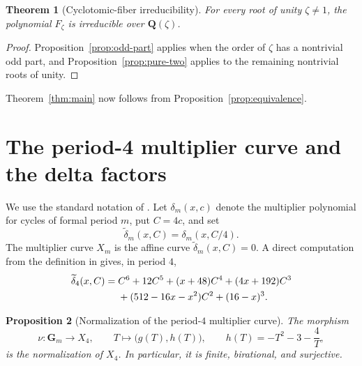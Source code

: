 \documentclass[11pt]{article}
\newtheorem{theorem}{Theorem}[section]
\newtheorem{proposition}[theorem]{Proposition}
\newcommand{\Q}{\mathbf Q}
\begin{document}
\begin{theorem}[Cyclotomic-fiber irreducibility]
\label{thm:base-fiber-irreducibility}
For every root of unity $\zeta\ne1$, the polynomial $F_\zeta$ is
irreducible over $\Q(\zeta)$.
\end{theorem}

\begin{proof}
Proposition~\ref{prop:odd-part} applies when the order of $\zeta$ has a
nontrivial odd part, and Proposition~\ref{prop:pure-two} applies to the
remaining nontrivial roots of unity.
\end{proof}

Theorem~\ref{thm:main} now follows from
Proposition~\ref{prop:equivalence}.

\section{The period-4 multiplier curve and the delta factors}
\label{sec:multiplier-curve}

We use the standard notation of
\cite{Morton1996,MortonVivaldi1995,KoizumiMurakamiSanoTakehira2025}.
Let $\delta_m(x,c)$ denote the multiplier polynomial for cycles of
formal period $m$, put $C=4c$, and set
\[
 \widetilde\delta_m(x,C)=\delta_m(x,C/4).
\]
The multiplier curve $X_m$ is the affine curve
$\widetilde\delta_m(x,C)=0$.  A direct computation from the definition
in \cite[Section 2]{KoizumiMurakamiSanoTakehira2025} gives, in period
$4$,
\begin{align}
 \widetilde\delta_4(x,C)={}&C^6+12C^5+(x+48)C^4
 +(4x+192)C^3 \notag\\
 &+(512-16x-x^2)C^2+(16-x)^3.
 \label{eq:explicit-delta-four}
\end{align}

\begin{proposition}[Normalization of the period-$4$ multiplier curve]
\label{prop:normalization}
The morphism
\[
 \nu:\mathbf G_m\longrightarrow X_4,
 \qquad T\longmapsto\bigl(g(T),h(T)\bigr),
 \qquad h(T)=-T^2-3-\frac4T,
\]
is the normalization of $X_4$.  In particular, it is finite,
birational, and surjective.
\end{proposition}
\end{document}
